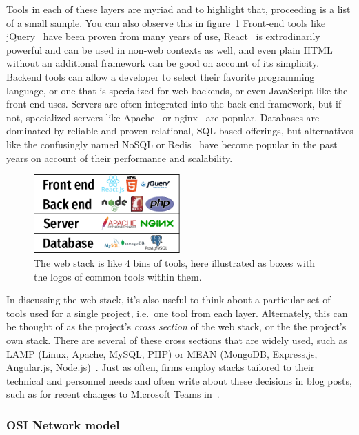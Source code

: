 \documentclass[english,12pt,a4paper,pdftex,eng,utf8]{aaltothesis}
\begin{document}
Tools in each of these layers are myriad and to highlight that, proceeding is a list of a small sample.  You can also observe this in figure~\ref{fig:web_stack}  Front-end tools like jQuery~\cite{jQuery} have been proven from many years of use, React~\cite{React} is extrodinarily powerful and can be used in non-web contexts as well, and even plain HTML without an additional framework can be good on account of its simplicity.  Backend tools can allow a developer to select their favorite programming language, or one that is specialized for web backends, or even JavaScript like the front end uses.  Servers are often integrated into the back-end framework, but if not, specialized servers like Apache~\cite{ApacheServer} or nginx~\cite{nginx} are popular.  Databases are dominated by reliable and proven relational, SQL-based offerings, but alternatives like the confusingly named NoSQL or Redis~\cite{redis} have become popular in the past years on account of their performance and scalability.

\begin{figure}[h]
  \centering
  \includegraphics[width=0.5\textwidth]{assets/web_stack}
  \caption{The web stack is like 4 bins of tools, here illustrated as boxes with the logos of common tools within them.}\label{fig:web_stack}
\end{figure}

In discussing the web stack, it's also useful to think about a particular set of tools used for a single project, i.e.\ one tool from each layer.  Alternately, this can be thought of as the project's {\it cross section\/} of the web stack, or the the project's own stack.  There are several of these cross sections that are widely used, such as LAMP (Linux, Apache, MySQL, PHP) or MEAN (MongoDB, Express.js, Angular.js, Node.js)~\cite{PranamStack2017}.  Just as often, firms employ stacks tailored to their technical and personnel needs and often write about these decisions in blog posts, such as for recent changes to Microsoft Teams in~\cite{Singh2023}.

\subsubsection{OSI Network model}
\end{document}

